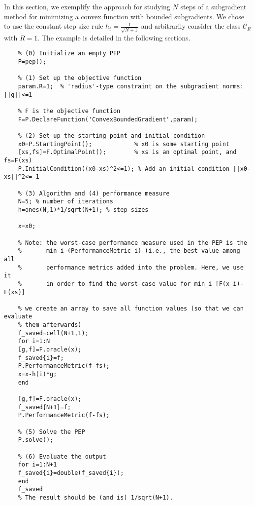 \documentclass[11pt,a4paper]{article}
\begin{document}
	In this section, we exemplify the approach for studying $N$ steps of a subgradient method for minimizing a convex function with bounded subgradients. We chose to use the constant step size rule $h_i=\frac{1}{\sqrt{N+1}}$ and arbitrarily consider the class $\mathcal{C}_R$ with $R=1$. The example is detailed in the following sections.
	\begin{lstlisting}
	% (0) Initialize an empty PEP
	P=pep();
	
	% (1) Set up the objective function
	param.R=1;	% 'radius'-type constraint on the subgradient norms: ||g||<=1
	
	% F is the objective function
	F=P.DeclareFunction('ConvexBoundedGradient',param); 
	
	% (2) Set up the starting point and initial condition
	x0=P.StartingPoint();            % x0 is some starting point
	[xs,fs]=F.OptimalPoint();        % xs is an optimal point, and fs=F(xs)
	P.InitialCondition((x0-xs)^2<=1); % Add an initial condition ||x0-xs||^2<= 1
	
	% (3) Algorithm and (4) performance measure
	N=5; % number of iterations
	h=ones(N,1)*1/sqrt(N+1); % step sizes
	
	x=x0;
	
	% Note: the worst-case performance measure used in the PEP is the 
	%       min_i (PerformanceMetric_i) (i.e., the best value among all
	%       performance metrics added into the problem. Here, we use it
	%       in order to find the worst-case value for min_i [F(x_i)-F(xs)]
	
	% we create an array to save all function values (so that we can evaluate
	% them afterwards)
	f_saved=cell(N+1,1);
	for i=1:N
	[g,f]=F.oracle(x);
	f_saved{i}=f;
	P.PerformanceMetric(f-fs);
	x=x-h(i)*g;
	end
	
	[g,f]=F.oracle(x);
	f_saved{N+1}=f;
	P.PerformanceMetric(f-fs);
	
	% (5) Solve the PEP
	P.solve();
	
	% (6) Evaluate the output
	for i=1:N+1
	f_saved{i}=double(f_saved{i});
	end
	f_saved
	% The result should be (and is) 1/sqrt(N+1).
	\end{lstlisting}
	\newpage
\end{document}
